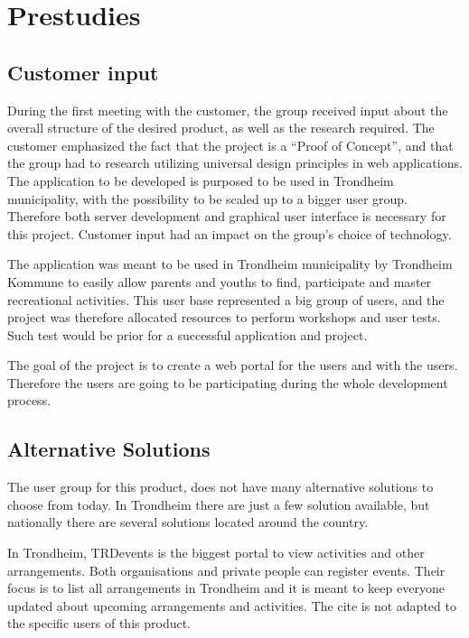 
\chapter{Prestudies}


\section{Customer input}
During the first meeting with the customer, the group received input about the overall structure of the desired product, as well as the research required. The customer emphasized the fact that the project is a “Proof of Concept”, and that the group had to research utilizing universal design principles in web applications. The application to be developed is purposed to be used in Trondheim municipality, with the possibility to be scaled up to a bigger user group. Therefore both server development and graphical user interface is necessary for this project. Customer input had an impact on the group's choice of technology.

The application was meant to be used in Trondheim municipality by Trondheim Kommune to easily allow parents and youths to find, participate and master recreational activities. This user base represented a big group of users, and the project was therefore allocated resources to perform workshops and user tests. Such test would be prior for a successful application and project.

The goal of the project is to create a web portal for the users and with the users. Therefore the users are going to be participating during the whole development process.

\section{Alternative Solutions}
The user group for this product, does not have many alternative solutions to choose from today. In Trondheim there are just a few solution available, but nationally there are several solutions located around the country. 

In Trondheim, TRDevents \cite{TRDevents} is the biggest portal to view activities and other arrangements. Both organisations and private people can register events. Their focus is to list all arrangements in Trondheim and it is meant to keep everyone updated about upcoming arrangements and activities. The cite is not adapted to the specific users of this product.

